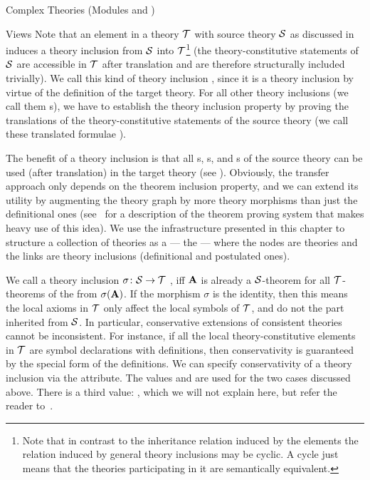 \begin{tchapter}[id=complex-theories,short=Complex Theories]{Complex Theories (Modules
     and )}
\begin{tsection}[id=views]{Views}
  Note that an  element in a theory ${\cal T}$ with source theory ${\cal S}$ as
  discussed in  induces a theory inclusion from ${\cal S}$ into
  ${\cal T}$\footnote{Note that in contrast to the inheritance relation induced by the
     elements the relation induced by general theory inclusions may be
    cyclic. A cycle just means that the theories participating in it are semantically
    equivalent.} (the theory-constitutive statements of ${\cal S}$ are accessible in ${\cal T}$
  after translation and are therefore structurally included trivially).  We call this kind
  of theory inclusion , since
  it is a theory inclusion by virtue of the definition of the target theory.  For all
  other theory inclusions (we call them {s}), we
  have to establish the theory inclusion property by proving the translations of the
  theory-constitutive statements of the source theory (we call these translated formulae
  ).

  The benefit of a theory inclusion is that all {s},
  s, and s of the source theory can be used
  (after translation) in the target theory (see ).
  Obviously, the transfer approach only depends on the theorem inclusion property, and we
  can extend its utility by augmenting the theory graph by more theory morphisms than just
  the definitional ones (see~\cite{FaGu93} for a description of the {\imps} theorem
  proving system that makes heavy use of this idea).  We use the infrastructure presented
  in this chapter to structure a collection of theories as a  --- the
   --- where the nodes are theories and the links are theory
  inclusions (definitional and postulated ones).

  We call a theory inclusion $\sigma\colon{\cal S}\to{\cal T}$ , iff ${\bf A}$ is
  already a ${\cal S}$-theorem for all ${\cal T}$-theorems of the from $\sigma({\bf A})$. If the
  morphism $\sigma$ is the identity, then this means the local axioms in ${\cal T}$ only affect
  the local symbols of ${\cal T}$, and do not the part inherited from ${\cal S}$. In particular,
  conservative extensions of consistent theories cannot be inconsistent. For instance, if
  all the local theory-constitutive elements in ${\cal T}$ are symbol declarations with
  definitions, then conservativity is guaranteed by the special form of the
  definitions. We can specify conservativity of a theory inclusion via the
   attribute. The values
   and
   are used for the two cases discussed
  above. There is a third value: , which we
  will not explain here, but refer the reader to~\cite{MAH-06-a}.


\end{tsection}
\end{tchapter}
